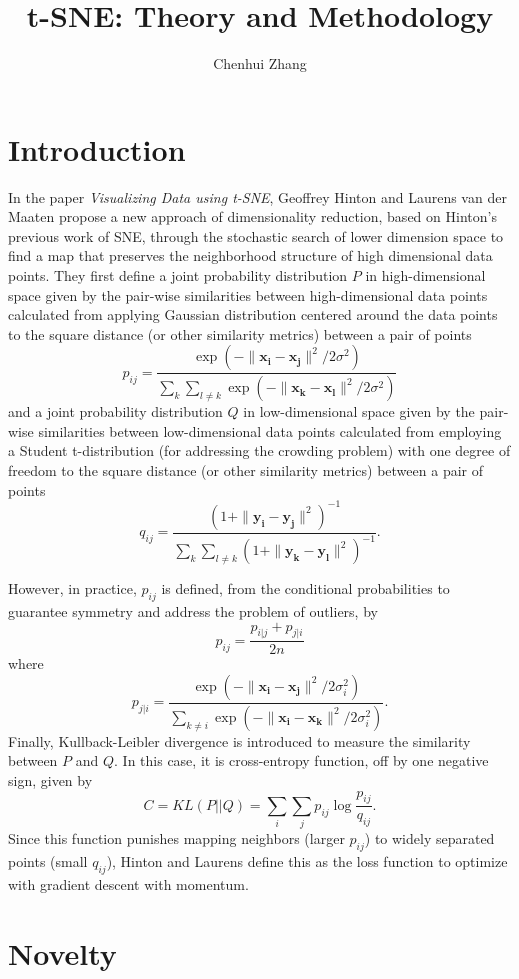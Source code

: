 \documentclass[letter,10pt]{article}
\title{t-SNE: Theory and Methodology}
\author{Chenhui Zhang}
\begin{document}
\maketitle

\medskip

\section{Introduction}
In the paper \textit{Visualizing Data using t-SNE}\cite{vanDerMaaten2008}, Geoffrey Hinton and Laurens van der Maaten propose a new approach of dimensionality reduction, based on Hinton's previous work of SNE, through the stochastic search of lower dimension space to find a map that preserves the neighborhood structure of high dimensional data points. They first define a joint probability distribution $P$ in high-dimensional space given by the pair-wise similarities between high-dimensional data points calculated from applying Gaussian distribution centered around the data points to the square distance (or other similarity metrics) between a pair of points
$$
p_{ij}=\frac{\exp{(-\|\mathbf{x_i}-\mathbf{x_j}\|^2/2\sigma^2)}}{\sum_{k}\sum_{l\neq k}\exp(-\|\mathbf{x_k}-\mathbf{x_l}\|^{2}/2\sigma^2)}
$$
and a joint probability distribution $Q$ in low-dimensional space given by the pair-wise similarities between low-dimensional data points calculated from employing a Student t-distribution (for addressing the crowding problem) with one degree of freedom to the square distance (or other similarity metrics) between a pair of points
$$
q_{ij}=\frac{(1+\|\mathbf{\mathbf{y_i}-\mathbf{y_j}}\|^2)^{-1}}{\sum_{k}\sum_{l\neq k}(1+\|\mathbf{y_k}-\mathbf{y_l}\|^2)^{-1}}.
$$


However, in practice, $p_{ij}$ is defined, from the conditional probabilities to guarantee symmetry and address the problem of outliers, by
$$
p_{ij}=\frac{p_{i|j}+p_{j|i}}{2n}
$$
where
$$
p_{j|i}=\frac{\exp{(-\|\mathbf{x_i}-\mathbf{x_j}\|^2/2\sigma_i^2)}}{\sum_{k\neq i}\exp(-\|\mathbf{x_i}-\mathbf{x_k}\|^{2}/2\sigma_{i}^2)}.
$$
Finally, Kullback-Leibler divergence is introduced to measure the similarity between $P$ and $Q$. In this case, it is cross-entropy function, off by one negative sign, given by
$$
C=KL(P||Q)=\sum_{i}\sum_{j}p_{ij}\log{\frac{p_{ij}}{q_{ij}}}.
$$
Since this function punishes mapping neighbors (larger $p_{ij}$) to widely separated points (small $q_{ij}$), Hinton and Laurens define this as the loss function to optimize with gradient descent with momentum.

\section{Novelty}
\end{document}
